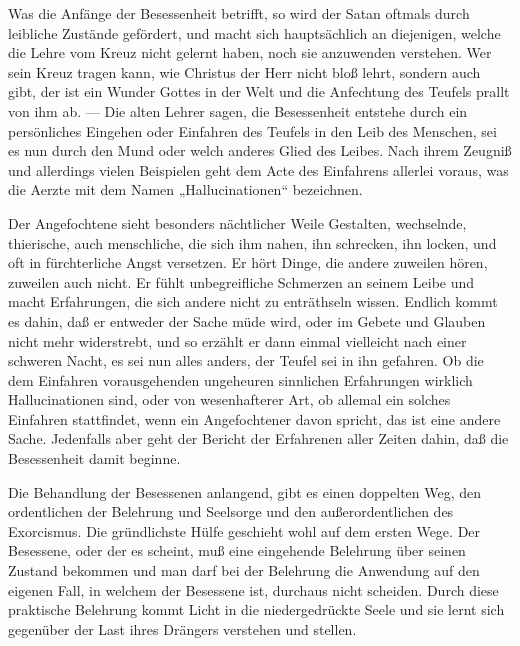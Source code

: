 Was die Anfänge der Besessenheit betrifft, so wird der Satan oftmals durch leibliche Zustände gefördert, und macht sich hauptsächlich an diejenigen, welche die Lehre vom Kreuz nicht gelernt haben, noch sie anzuwenden verstehen. Wer sein Kreuz tragen kann, wie Christus der Herr nicht bloß lehrt, sondern auch gibt, der ist ein Wunder Gottes in der Welt und die Anfechtung des Teufels prallt von ihm ab. — Die alten Lehrer sagen, die Besessenheit entstehe durch ein persönliches Eingehen oder Einfahren des Teufels in den Leib des Menschen, sei es nun durch den Mund oder welch anderes Glied des Leibes. Nach ihrem Zeugniß und allerdings vielen Beispielen geht dem Acte des Einfahrens allerlei voraus, was die Aerzte mit dem Namen „Hallucinationen“ bezeichnen.

Der Angefochtene sieht besonders nächtlicher Weile Gestalten, wechselnde, thierische, auch menschliche, die sich ihm nahen, ihn schrecken, ihn locken, und oft in fürchterliche Angst versetzen. Er hört Dinge, die andere zuweilen hören, zuweilen auch nicht. Er fühlt unbegreifliche Schmerzen an seinem Leibe und macht Erfahrungen, die sich andere nicht zu enträthseln wissen. Endlich kommt es dahin, daß er entweder der Sache müde wird, oder im Gebete und Glauben nicht mehr widerstrebt, und so erzählt er dann einmal vielleicht nach einer schweren Nacht, es sei nun alles anders, der Teufel sei in ihn gefahren. Ob die dem Einfahren vorausgehenden ungeheuren sinnlichen Erfahrungen wirklich Hallucinationen sind, oder von wesenhafterer Art, ob allemal ein solches Einfahren stattfindet, wenn ein Angefochtener davon spricht, das ist eine andere Sache. Jedenfalls aber geht der Bericht der Erfahrenen aller Zeiten dahin, daß die Besessenheit damit beginne.

Die Behandlung der Besessenen anlangend, gibt es einen doppelten Weg, den ordentlichen der Belehrung und Seelsorge und den außerordentlichen des Exorcismus. Die gründlichste Hülfe geschieht wohl auf dem ersten Wege. Der Besessene, oder der es scheint, muß eine eingehende Belehrung über seinen Zustand bekommen und man darf bei der Belehrung die Anwendung auf den eigenen Fall, in welchem der Besessene ist, durchaus nicht scheiden. Durch diese praktische Belehrung kommt Licht in die niedergedrückte Seele und sie lernt sich gegenüber der Last ihres Drängers verstehen und stellen.

